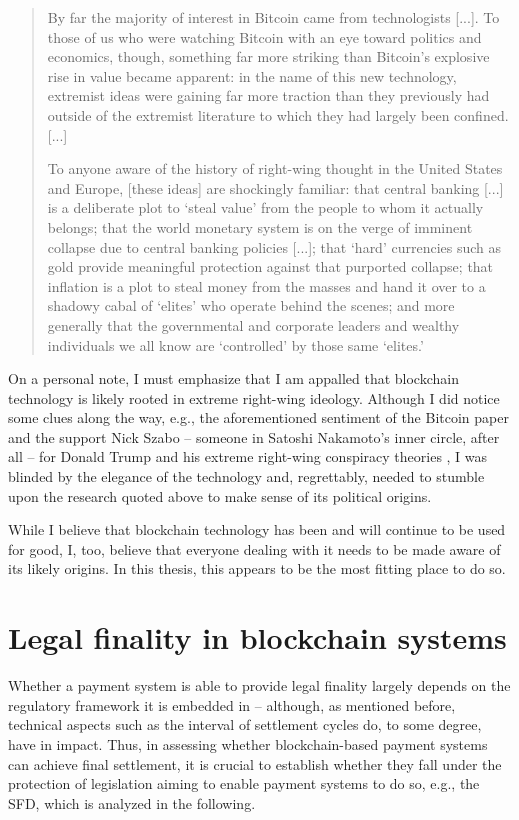 \begin{quote}
  By far the majority of interest in Bitcoin came from technologists [...].
  To those of us who were watching Bitcoin with an eye toward politics and economics, though, something far more striking than Bitcoin’s explosive rise in value became apparent:
  in the name of this new technology, extremist ideas were gaining far more traction than they previously had outside of the extremist literature to which they had largely been confined. [...]

  To anyone aware of the history of right-wing thought in the United States and Europe, [these ideas] are shockingly familiar:
  that central banking [...] is a deliberate plot to `steal value' from the people to whom it actually belongs; that the world monetary system is on the verge of imminent collapse due to central banking policies [...]; that `hard' currencies such as gold provide meaningful protection against that purported collapse; that inflation is a plot to steal money from the masses and hand it over to a shadowy cabal of `elites' who operate behind the scenes; and more generally that the governmental and corporate leaders and wealthy individuals we all know are `controlled' by those same `elites.'
\end{quote}

On a personal note, I must emphasize that I am appalled that blockchain technology is likely rooted in extreme right-wing ideology.
Although I did notice some clues along the way, e.g., the aforementioned sentiment of the Bitcoin paper and the support Nick Szabo -- someone in Satoshi Nakamoto's inner circle, after all -- for Donald Trump and his extreme right-wing conspiracy theories \autocite{szabo2020}, I was blinded by the elegance of the technology and, regrettably, needed to stumble upon the research quoted above to make sense of its political origins.

While I believe that blockchain technology has been and will continue to be used for good, I, too, believe that everyone dealing with it needs to be made aware of its likely origins.
In this thesis, this appears to be the most fitting place to do so.

\section{Legal finality in blockchain systems}

Whether a payment system is able to provide legal finality largely depends on the regulatory framework it is embedded in -- although, as mentioned before, technical aspects such as the interval of settlement cycles do, to some degree, have in impact.
Thus, in assessing whether blockchain-based payment systems can achieve final settlement, it is crucial to establish whether they fall under the protection of legislation aiming to enable payment systems to do so, e.g., the SFD, which is analyzed in the following.

